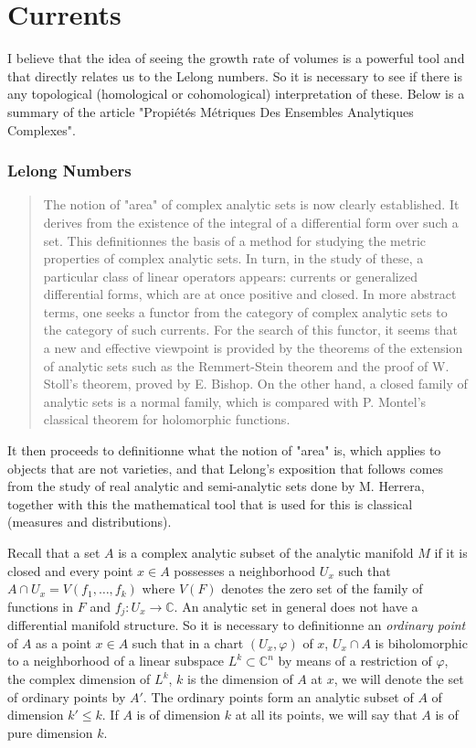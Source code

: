 \documentclass[12pt,twoside,a4paper]{report}
\begin{document}
\chapter{Currents}
\pagestyle{fancy}
\fancyhf{}
\fancyhead[LE]{\rightmark}
\fancyhead[RO]{\leftmark}
\fancyfoot[C]{\thepage}
\noindent I believe that the idea of seeing the growth rate of volumes is a powerful tool and that directly relates us to the Lelong numbers. So it is necessary to see if there is any topological (homological or cohomological) interpretation of these. Below is a summary of the article "Propiétés Métriques Des Ensembles Analytiques Complexes".
\subsection{Lelong Numbers}
\begin{quote}
The notion of "area" of complex analytic sets is now clearly established. It derives from the existence of the integral of a differential form over such a set. This definitionnes the basis of a method for studying the metric properties of complex analytic sets. In turn, in the study of these, a particular class of linear operators appears: currents or generalized differential forms, which are at once positive and closed. In more abstract terms, one seeks a functor from the category of complex analytic sets to the category of such currents. For the search of this functor, it seems that a new and effective viewpoint is provided by the theorems of the extension of analytic sets such as the Remmert-Stein theorem and the proof of W. Stoll's theorem, proved by E. Bishop. On the other hand, a closed family of analytic sets is a normal family, which is compared with P. Montel's classical theorem for holomorphic functions.
\end{quote}

\noindent It then proceeds to definitionne what the notion of "area" is, which applies to objects that are not varieties, and that Lelong's exposition that follows comes from the study of real analytic and semi-analytic sets done by M. Herrera, together with this the mathematical tool that is used for this is classical (measures and distributions).

Recall that a set $A$ is a complex analytic subset of the analytic manifold $M$ if it is closed and every point $x\in A$ possesses a neighborhood $U_x$ such that $A\cap U_x=V(f_1,\dots,f_k)$ where $V(F)$ denotes the zero set of the family of functions in $F$ and $f_j:U_x\rightarrow\mathbb{C}$. An analytic set in general does not have a differential manifold structure. So it is necessary to definitionne an \emph{ordinary point} of $A$ as a point $x\in A$ such that in a chart $(U_x,\varphi)$ of $x$, $U_x\cap A$ is biholomorphic to a neighborhood of a linear subspace $L^{k}\subset\mathbb{C}^n$ by means of a restriction of $\varphi$, the complex dimension of $L^{k}$, $k$ is the dimension of $A$ at $x$, we will denote the set of ordinary points by $A'$. The ordinary points form an analytic subset of $A$ of dimension $k'\leq k$. If $A$ is of dimension $k$ at all its points, we will say that $A$ is of pure dimension $k$.
\end{document}

